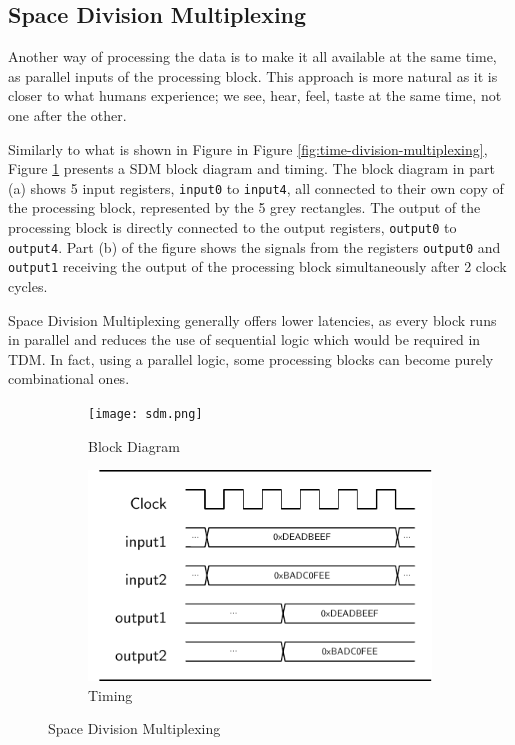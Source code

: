 \subsection{Space Division Multiplexing}
Another way of processing the data is to make it all available at the same time, as parallel inputs of the processing block. This approach is more natural as it is closer to what humans experience; we see, hear, feel, taste at the same time, not one after the other. 

Similarly to what is shown in Figure in Figure \ref{fig:time-division-multiplexing}, Figure \ref{fig:space-division-multiplexing} presents a SDM block diagram and timing. The block diagram in part (a) shows 5 input registers, \verb|input0| to \verb|input4|, all connected to their own copy of the processing block, represented by the 5 grey rectangles. The output of the processing block is directly connected to the output registers, \verb|output0| to \verb|output4|. Part (b) of the figure shows the signals from the registers \verb|output0| and \verb|output1| receiving the output of the processing block simultaneously after 2 clock cycles.

Space Division Multiplexing generally offers lower latencies, as every block runs in parallel and reduces the use of sequential logic which would be required in TDM. In fact, using a parallel logic, some processing blocks can become purely combinational ones.

\begin{figure}
    \begin{subfigure}{.5\textwidth}
        \centering
        \texttt{[image: sdm.png]}
        \caption{Block Diagram}
    \end{subfigure}
    \begin{subfigure}{.5\textwidth}
        \centering
        \includegraphics[width=1\linewidth]{../timings/sdm.pdf}
        \caption{Timing}
    \end{subfigure}
    \caption{Space Division Multiplexing}
    \label{fig:space-division-multiplexing}
\end{figure}

